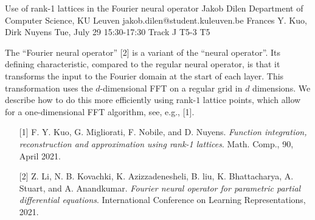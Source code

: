 \begin{talk}
\end{talk}

\begin{talk}
  {Use of rank-1 lattices in the Fourier neural operator}%
  {Jakob Dilen}%
  {Department of Computer Science, KU Leuven}%
  {jakob.dilen@student.kuleuven.be}%
  {Frances Y. Kuo, Dirk Nuyens}%
  {}%
  {Tue, July 29 15:30-17:30 Track J}%
  {T5-3}%
  {T5}%
  
				

The ``Fourier neural operator'' [2] is a variant of the ``neural operator''.
Its defining characteristic, compared to the regular neural operator, is that it transforms the input to the Fourier domain at the start of each layer. This transformation uses the $d$-dimensional FFT on a regular grid in $d$ dimensions. We describe how to do this more efficiently using rank-$1$ lattice points, which allow for a one-dimensional FFT algorithm, see, e.g., [1]. 

\medskip
\begin{enumerate}
        \item[{[1]}] F. Y. Kuo, G. Migliorati, F. Nobile, and D. Nuyens. \textit{Function integration,
reconstruction and approximation using rank-1 lattices}. Math. Comp., 90, April
2021.   
        \item[{[2]}] Z. Li, N. B. Kovachki, K. Azizzadenesheli, B. liu, K. Bhattacharya, A. Stuart,
and A. Anandkumar. \textit{Fourier neural operator for parametric partial differential
equations}. International Conference on Learning Representations, 2021.
\end{enumerate}
\end{talk}

